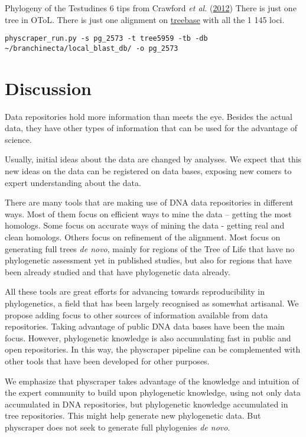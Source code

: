 \documentclass[]{article}
\begin{document}
Phylogeny of the Testudines 6 tips from Crawford \emph{et al.} (\protect\hyperlink{ref-crawford2012more}{2012})
There is just one tree in OToL.
There is just one alignment on \href{https://treebase.org/treebase-web/search/study/matrices.html?id=12742}{treebase} with all the 1 145 loci.

\begin{verbatim}
physcraper_run.py -s pg_2573 -t tree5959 -tb -db ~/branchinecta/local_blast_db/ -o pg_2573
\end{verbatim}

\hypertarget{discussion}{%
\section{Discussion}\label{discussion}}

Data repositories hold more information than meets the eye.
Besides the actual data, they have other types of information that can be used for the advantage of science.

Usually, initial ideas about the data are changed by analyses.
We expect that this new ideas on the data can be registered on data bases,
exposing new comers to expert understanding about the data.

There are many tools that are making use of DNA data repositories in different ways.
Most of them focus on efficient ways to mine the data -- getting the most homologs.
Some focus on accurate ways of mining the data - getting real and clean homologs.
Others focus on refinement of the alignment.
Most focus on generating full trees \emph{de novo}, mainly for regions of the Tree of
Life that have no phylogenetic assessment yet in published studies, but also for
regions that have been already studied and that have phylogenetic data already.

All these tools are great efforts for advancing towards reproducibility in phylogenetics,
a field that has been largely recognised as somewhat artisanal.
We propose adding focus to other sources of information available from data repositories.
Taking advantage of public DNA data bases have been the main focus. However, phylogenetic knowledge is
also accumulating fast in public and open repositories.
In this way, the physcraper pipeline can be complemented with other tools that have
been developed for other purposes.

We emphasize that physcraper takes advantage of the knowledge and intuition of the expert
community to build upon phylogenetic knowledge, using not only data accumulated in
DNA repositories, but phylogenetic knowledge accumulated in tree repositories.
This might help generate new phylogenetic data. But physcraper does not seek to generate full phylogenies \emph{de novo}.
\end{document}
